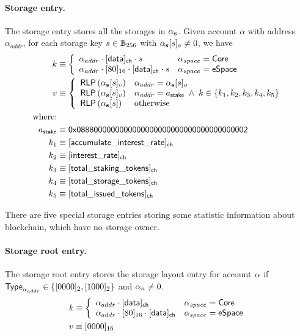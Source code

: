 \paragraph{Storage entry.} The storage entry stores all the storages in $\mathbf{\alpha}_{\bf s}$. Given account $\alpha$ with address $\alpha_{addr}$, for each storage key $s\in \mathbb{B}_{256}$ with $\mathbf{\alpha}_{\bf s}[s]_v\neq 0$, we have 
\begin{align}
	k&\eqdef \left\{\begin{array}{ll}
		\alpha_{addr}\cdot [{\sf data}]_{\sf ch}\cdot s & \account_{space}=\mathsf{Core} \\
		\alpha_{addr}\cdot [80]_{16} \cdot [{\sf data}]_{\sf ch}\cdot s & \account_{space}=\mathsf{eSpace}
	\end{array}\right.\\
	v&\eqdef \left\{ \begin{array}{ll}
		\rlp\left(\account_{\bf s}[s]_v\right) & \alpha_{addr} = \account_{\bf s}[s]_o \\ 
		\rlp\left(\account_{\bf s}[s]_v\right) & \alpha_{addr} = a_{\sf stake} \;\wedge\; k \in \{k_1,k_2,k_3,k_4,k_5\} \\ 
		\rlp\left(\account_{\bf s}[s]\right) & \mbox{otherwise}
	\end{array}\right.\\
	\mbox{where:} &\\
	a_{\sf stake} &\eqdef \stakingcontract \\
	k_1 &\eqdef \sf [accumulate\char`_interest\char`_rate]_{\sf ch} \\ 
	k_2 &\eqdef \sf [interest\char`_rate]_{\sf ch} \\
    k_3 &\eqdef \sf [total\char`_staking\char`_tokens]_{\sf ch} \\
    k_4 &\eqdef \sf [total\char`_storage\char`_tokens]_{\sf ch} \\
    k_5 &\eqdef \sf [total\char`_issued\char`_tokens]_{\sf ch} 
\end{align}

There are five special storage entries storing some statistic information about \name blockchain, which have no storage owner. 

\paragraph{Storage root entry.} The storage root entry stores the storage layout entry for account $\mathbf{\alpha}$ if $\mathsf{Type}_{\mathbf{\alpha}_{addr}}\in \{[0000]_2,[1000]_2\}$ and $\mathbf{\alpha}_n\neq 0$. 
\begin{align}
	&k\equiv \left\{\begin{array}{ll}
		\alpha_{addr} \cdot [{\sf data}]_{\sf ch}& \mathbf{\alpha}_{space}=\mathsf{Core} \\
		\alpha_{addr}\cdot [80]_{16}\cdot [{\sf data}]_{\sf ch} & \mathbf{\alpha}_{space}=\mathsf{eSpace}
	\end{array}\right.\\
	&v\equiv [0000]_{16}
\end{align}

